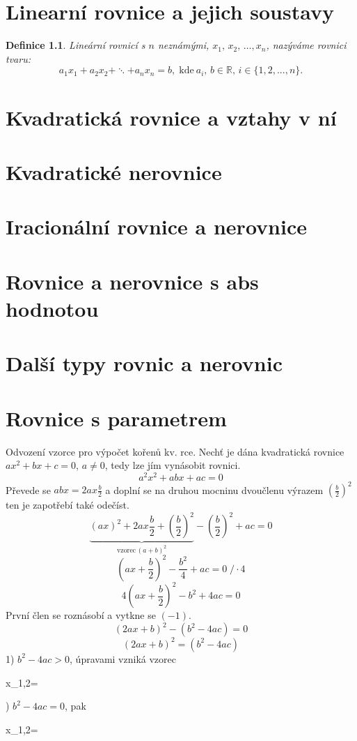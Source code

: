\documentclass[12pt,a4wide,oneside,
headings]{report}
\newtheorem{defi}{Definice}[chapter]\theoremstyle{definition}
\newenvironment{eq}{\begin{tcolorbox}[ams equation,colback=yourcolor!10!white,colframe=yourcolor]}{\end{tcolorbox}}
\begin{document}
\chapter{Linearní rovnice a jejich soustavy}
\begin{defi} Lineární rovnicí s $n$ neznámými, $x_1 ,\, x_2 ,\,\dots, x_n$, nazýváme rovnici tvaru:
$$a_1 x_1 + a_2 x_2 + \ddots + a_n x_n = b, \;\mathrm{kde\:} a_i,\, b \in \mathbb{R},\,i\in\lbrace 1, 2, ... , n\rbrace.$$
\end{defi}


\chapter[Kvadratická rce]{Kvadratická rovnice a vztahy v ní}
\chapter{Kvadratické nerovnice}
\chapter{Iracionální rovnice a nerovnice}
\chapter{Rovnice a nerovnice s abs hodnotou}
\chapter{Další typy rovnic a nerovnic}
\chapter{Rovnice s parametrem}
Odvození vzorce pro výpočet kořenů kv. rce. Nechť je dána kvadratická rovnice $ax^2+bx+c=0$, $a\neq 0$, tedy lze jím vynásobit rovnici. 
$$a^2x^2+abx+ac=0 $$
Převede se $abx=2ax\frac{b}{2}$ a doplní se na druhou mocninu dvoučlenu výrazem $\left(\frac{b}{2}\right)^2$ ten je zapotřebí také odečíst.
$$\underbrace{(ax)^2 + 2ax\frac{b}{2}+\left(\frac{b}{2}\right)^2}_{\mathrm{vzorec}\,(a+b)^2} -\left(\frac{b}{2}\right)^2 +ac=0$$
$$\left(ax+\frac{b}{2} \right)^2-\frac{b^2}{4}+ac=0\;/\cdot4 $$
$$4\left(ax+\frac{b}{2} \right)^2-b^2+4ac=0 $$ 
První člen se roznásobí a vytkne se $(-1)$.
$$\left(2ax+b \right)^2 -\left(b^2-4ac \right)=0$$
$$\left(2ax+b \right)^2 =\left(b^2-4ac \right)$$
1) $b^2-4ac>0$, úpravami vzniká vzorec
\begin{eq}
x_{1,2}=
\end{eq}
2) $b^2-4ac=0$, pak 
\begin{eq}
x_{1,2}=
\end{eq}
\end{document}
